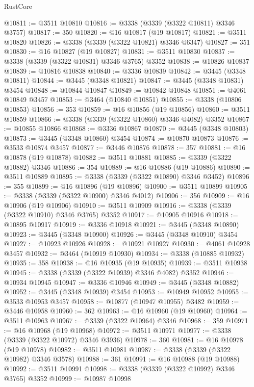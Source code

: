 \begin{lexlean}{RustCore}
\begin{coremodule}
@10811 := @3511 @10810
@10816 := @3338 (@3339 (@3322 @10811) @3346 @3757)
@10817 := 350
@10820 := @16 @10817 (@19 @10817)
@10821 := @3511 @10820
@10826 := @3338 (@3339 (@3322 @10821) @3346 @6347)
@10827 := 351
@10830 := @16 @10827 (@19 @10827)
@10831 := @3511 @10830
@10837 := @3338 (@3339 (@3322 @10831) @3346 @3765) @3352
@10838 := @10826 @10837
@10839 := @10816 @10838
@10840 := @3336 @10839
@10842 := @3445 (@3348 @10811)
@10844 := @3445 (@3348 @10821)
@10847 := @3445 (@3348 @10831) @3454
@10848 := @10844 @10847
@10849 := @10842 @10848
@10851 := @4061 @10849 @3457
@10853 := @3464 (@10840 @10851)
@10855 := @3338 (@10806 @10853)
@10856 := 353
@10859 := @16 @10856 (@19 @10856)
@10860 := @3511 @10859
@10866 := @3338 (@3339 (@3322 @10860) @3346 @4082) @3352
@10867 := @10855 @10866
@10868 := @3336 @10867
@10870 := @3445 (@3348 @10803)
@10873 := @3445 (@3348 @10860) @3454
@10874 := @10870 @10873
@10876 := @3533 @10874 @3457
@10877 := @3446 @10876
@10878 := 357
@10881 := @16 @10878 (@19 @10878)
@10882 := @3511 @10881
@10885 := @3339 (@3322 @10882) @3346
@10886 := 354
@10889 := @16 @10886 (@19 @10886)
@10890 := @3511 @10889
@10895 := @3338 (@3339 (@3322 @10890) @3346 @3452)
@10896 := 355
@10899 := @16 @10896 (@19 @10896)
@10900 := @3511 @10899
@10905 := @3338 (@3339 (@3322 @10900) @3346 @4012)
@10906 := 356
@10909 := @16 @10906 (@19 @10906)
@10910 := @3511 @10909
@10916 := @3338 (@3339 (@3322 @10910) @3346 @3765) @3352
@10917 := @10905 @10916
@10918 := @10895 @10917
@10919 := @3336 @10918
@10921 := @3445 (@3348 @10890)
@10923 := @3445 (@3348 @10900)
@10926 := @3445 (@3348 @10910) @3454
@10927 := @10923 @10926
@10928 := @10921 @10927
@10930 := @4061 @10928 @3457
@10932 := @3464 (@10919 @10930)
@10934 := @3338 (@10885 @10932)
@10935 := 358
@10938 := @16 @10935 (@19 @10935)
@10939 := @3511 @10938
@10945 := @3338 (@3339 (@3322 @10939) @3346 @4082) @3352
@10946 := @10934 @10945
@10947 := @3336 @10946
@10949 := @3445 (@3348 @10882)
@10952 := @3445 (@3348 @10939) @3454
@10953 := @10949 @10952
@10955 := @3533 @10953 @3457
@10958 := @10877 (@10947 @10955) @3482
@10959 := @3446 @10958
@10960 := 362
@10963 := @16 @10960 (@19 @10960)
@10964 := @3511 @10963
@10967 := @3339 (@3322 @10964) @3346
@10968 := 359
@10971 := @16 @10968 (@19 @10968)
@10972 := @3511 @10971
@10977 := @3338 (@3339 (@3322 @10972) @3346 @3936)
@10978 := 360
@10981 := @16 @10978 (@19 @10978)
@10982 := @3511 @10981
@10987 := @3338 (@3339 (@3322 @10982) @3346 @3578)
@10988 := 361
@10991 := @16 @10988 (@19 @10988)
@10992 := @3511 @10991
@10998 := @3338 (@3339 (@3322 @10992) @3346 @3765) @3352
@10999 := @10987 @10998

\end{coremodule}
\end{lexlean}
